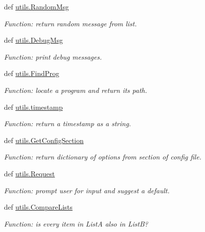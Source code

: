 \begin{DoxyCompactItemize}
\item 
def \hyperlink{namespaceutils_a17b230eb88f99a55015827768f6d5c6e}{utils.\-Random\-Msg}
\begin{DoxyCompactList}\small\item\em \-Function\-: return random message from list. \end{DoxyCompactList}\item 
def \hyperlink{namespaceutils_af5ae3c1612e367892e58315a2940e915}{utils.\-Debug\-Msg}
\begin{DoxyCompactList}\small\item\em \-Function\-: print debug messages. \end{DoxyCompactList}\item 
def \hyperlink{namespaceutils_a5ef7bf1967d090f2ecaa50e9c8ab6493}{utils.\-Find\-Prog}
\begin{DoxyCompactList}\small\item\em \-Function\-: locate a program and return its path. \end{DoxyCompactList}\item 
def \hyperlink{namespaceutils_a927f86c5699bd9ab878049b546c362d0}{utils.\-timestamp}
\begin{DoxyCompactList}\small\item\em \-Function\-: return a timestamp as a string. \end{DoxyCompactList}\item 
def \hyperlink{namespaceutils_aa25951c5f891d358a3f096d8a4a57e15}{utils.\-Get\-Config\-Section}
\begin{DoxyCompactList}\small\item\em \-Function\-: return dictionary of options from section of config file. \end{DoxyCompactList}\item 
def \hyperlink{namespaceutils_acb9359809500c419d9a89eb8f0ae5a60}{utils.\-Request}
\begin{DoxyCompactList}\small\item\em \-Function\-: prompt user for input and suggest a default. \end{DoxyCompactList}\item 
def \hyperlink{namespaceutils_ae8afd421a5739ce9f72a2c52fd1a70a2}{utils.\-Compare\-Lists}
\begin{DoxyCompactList}\small\item\em \-Function\-: is every item in \-List\-A also in \-List\-B? \end{DoxyCompactList}\item 

\end{DoxyCompactItemize}
